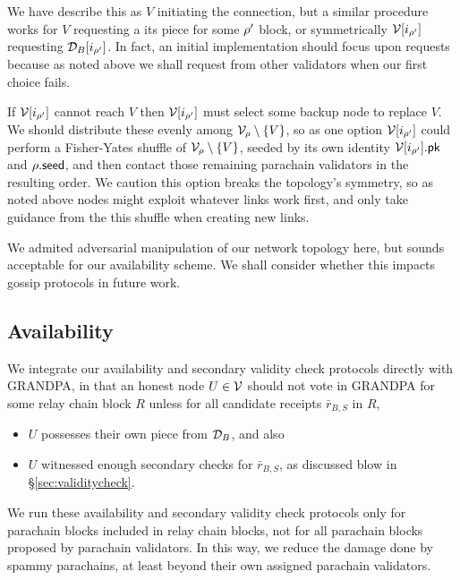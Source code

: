 We have describe this as $V$ initiating the connection, but a similar procedure works for $V$ requesting a its piece for some $\rho'$ block, or symmetrically $\mathcal{V}[i_{\rho'}]$ requesting $\mathcal{D}_B[i_{\rho'}]$.  In fact, an initial implementation should focus upon requests because as noted above we shall request from other validators when our first choice fails. 

If $\mathcal{V}[i_{\rho'}]$ cannot reach $V$ then $\mathcal{V}[i_{\rho'}]$ must select some backup node to replace $V$.  We should distribute these evenly among $\mathcal{V}_{\rho} \setminus \{V\}$, so as one option $\mathcal{V}[i_{\rho'}]$ could perform a Fisher-Yates shuffle of $\mathcal{V}_{\rho} \setminus \{V\}$, seeded by its own identity $\mathcal{V}[i_{\rho'}].\mathsf{pk}$ and $\rho.\mathsf{seed}$, and then contact those remaining parachain validators in the resulting order.  We caution this option breaks the topology's symmetry, so as noted above nodes might exploit whatever links work first, and only take guidance from the this shuffle when creating new links.  

We admited adversarial manipulation of our network topology here, but sounds acceptable for our availability scheme.  We shall consider whether this impacts gossip protocols in future work. 


\subsection{Availability} %
\label{sec:availability}

We integrate our availability and secondary validity check protocols directly with GRANDPA, in that an honest node $U \in \mathcal{V}$ should not vote in GRANDPA for some relay chain block $R$ unless for all candidate receipts $\bar{r}_{B,S}$ in $R$,
\begin{itemize}
\item $U$ possesses their own piece from $\mathcal{D}_B$, and also
\item $U$ witnessed enough secondary checks for $\bar{r}_{B,S}$,
 as discussed blow in \S\ref{sec:validitycheck}.
\end{itemize}

We run these availability and secondary validity check protocols only for parachain blocks included in relay chain blocks, not for all parachain blocks proposed by parachain validators.  In this way, we reduce the damage done by spammy parachains, at least beyond their own assigned parachain validators.

